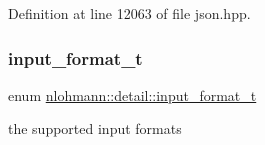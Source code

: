 Definition at line 12063 of file json.\+hpp.

\mbox{\label{namespacenlohmann_1_1detail_aa554fc6a11519e4f347deb25a9f0db40}} 
\subsubsection{\texorpdfstring{input\_format\_t}{input\_format\_t}}
{\footnotesize\ttfamily enum \mbox{\hyperlink{namespacenlohmann_1_1detail_aa554fc6a11519e4f347deb25a9f0db40}{nlohmann\+::detail\+::input\+\_\+format\+\_\+t}}\hspace{0.3cm}{\ttfamily [strong]}}



the supported input formats 

